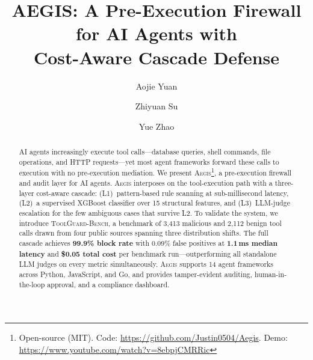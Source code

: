 \documentclass[sigconf,nonacm]{acmart}
\newcommand{\system}{\textsc{Aegis}\xspace}
\newcommand{\bench}{\textsc{ToolGuard-Bench}\xspace}
\begin{document}
\acmConference{}{}{}
\authorsaddresses{}

\title{AEGIS: A Pre-Execution Firewall for AI Agents with\\ Cost-Aware Cascade Defense}

\author{Aojie Yuan}

\author{Zhiyuan Su}

\author{Yue Zhao}

\begin{abstract}
AI agents increasingly execute tool calls---database queries, shell commands, file operations, and HTTP requests---yet most agent frameworks forward these calls to execution with no pre-execution mediation.
We present \system\footnote{Open-source (MIT). Code: \url{https://github.com/Justin0504/Aegis}. Demo: \url{https://www.youtube.com/watch?v=8ebpjCMRRic}}, a pre-execution firewall and audit layer for AI agents.
\system interposes on the tool-execution path with a three-layer cost-aware cascade: (L1)~pattern-based rule scanning at sub-millisecond latency, (L2)~a supervised XGBoost classifier over 15 structural features, and (L3)~LLM-judge escalation for the few ambiguous cases that survive L2.
To validate the system, we introduce \bench, a benchmark of 3{,}413 malicious and 2{,}112 benign tool calls drawn from four public sources spanning three distribution shifts.
The full cascade achieves \textbf{99.9\% block rate} with 0.09\% false positives at \textbf{1.1\,ms median latency} and \textbf{\$0.05 total cost} per benchmark run---outperforming all standalone LLM judges on every metric simultaneously.
\system supports 14 agent frameworks across Python, JavaScript, and Go, and provides tamper-evident auditing, human-in-the-loop approval, and a compliance dashboard.
\end{abstract}


\maketitle
\end{document}
